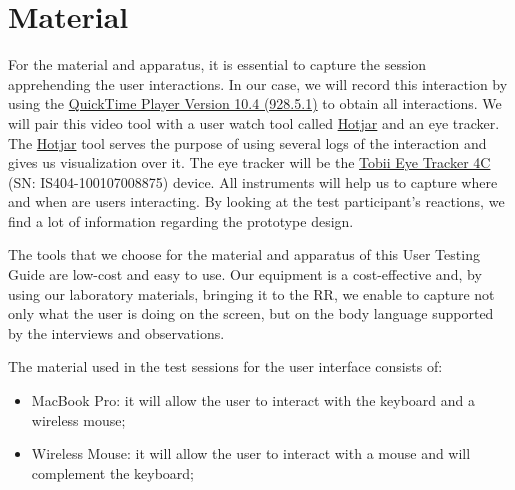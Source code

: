 
\section{Material}
\label{sec:sec005}

For the material and apparatus, it is essential to capture the session apprehending the user interactions. In our case, we will record this interaction by using the \hyperlink{https://support.apple.com/quicktime}{QuickTime Player Version 10.4 (928.5.1)} to obtain all interactions. We will pair this video tool with a user watch tool called \hyperlink{https://www.hotjar.com/}{Hotjar} and an eye tracker. The \hyperlink{https://www.hotjar.com/}{Hotjar} tool serves the purpose of using several logs of the interaction and gives us visualization over it. The eye tracker will be the \hyperlink{https://gaming.tobii.com/product/tobii-eye-tracker-4c/}{Tobii Eye Tracker 4C} (SN: IS404-100107008875) device. All instruments will help us to capture where and when are users interacting. By looking at the test participant's reactions, we find a lot of information regarding the prototype design.

The tools that we choose for the material and apparatus of this User Testing Guide are low-cost and easy to use. Our equipment is a cost-effective and, by using our laboratory materials, bringing it to the RR, we enable to capture not only what the user is doing on the screen, but on the body language supported by the interviews and observations.

\hfill

The material used in the test sessions for the user interface consists of:

\begin{itemize}
\item MacBook Pro: it will allow the user to interact with the keyboard and a wireless mouse;
\item Wireless Mouse: it will allow the user to interact with a mouse and will complement the keyboard;
\end{itemize}


